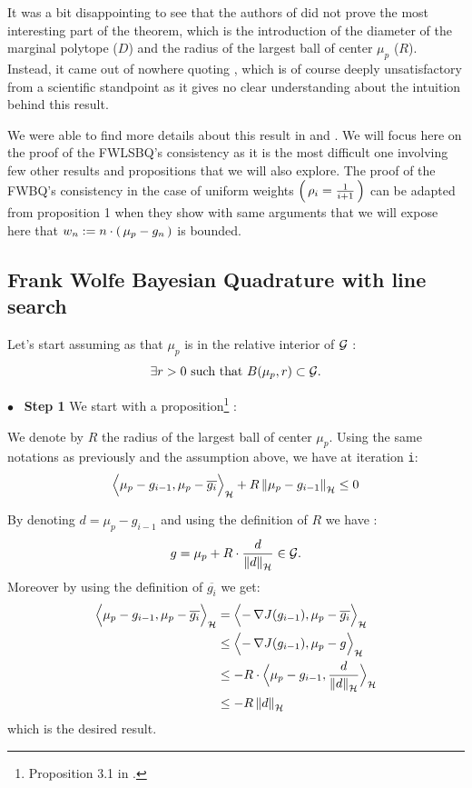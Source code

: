 It was a bit disappointing to see that the authors of \cite{FWBQ} did not prove the most interesting part of the theorem,
 which is the introduction of the diameter of the marginal polytope ($D$) and the radius of the largest ball of center $\mu_p$ ($R$). Instead, it came out of nowhere quoting \cite{Bach}, which is of course deeply unsatisfactory from a scientific standpoint
  as it gives no clear understanding about the intuition behind this result.

  We were able to find more details about this result in \cite{Beck} and \cite{Chen}.
  We will focus here on the proof of the FWLSBQ's consistency as it is the most
  difficult one involving few other results and propositions that we will also
  explore. The proof of the FWBQ's consistency in the case of uniform weights $\left( \, \rho_i=\frac{1}{i+1} \, \right)$ can be adapted from \cite{Chen} proposition 1 when they
  show with same arguments that we will expose here that $w_n := n\cdot
  \left( \, \mu_p-g_n \, \right)$ is bounded.

\subsection*{Frank Wolfe Bayesian Quadrature with line search}

Let's start assuming as \cite{Bach} that $\mu_p$ is in the relative interior
of $\mathcal{G}$ :
\begin{equation}
\exists r>0 \text{ such that } B(\mu_p, r) \subset \mathcal{G}.
\end{equation}

{$\bullet$~\normalfont\bfseries\color{myorange!90!black} Step 1 }We start with a proposition\footnote{Proposition 3.1 in \cite{Beck}.} :
\begin{boxtheorem}
  We denote by $R$ the radius of the largest ball of center $\mu_p$.
  Using the same notations as previously and the assumption above, we have at
  iteration \texttt{i}:
  \begin{equation}
    \label{eq:18}
    \Bigps{\mu_p-g_{i-1}}{\mu_p-\overline{g_{i}}}+R \norme{\mu_p-g_{i-1}} \leq 0
  \end{equation}
\end{boxtheorem}

  By denoting $d = \mu_p-g_{i-1}$ and using the definition of $R$ we have :
\begin{equation*}
  g = \mu_p+R\cdot \frac{d}{\norme{d}} \in \G.
\end{equation*}
Moreover by using the definition of $\overline{g_{i}}$ we get:
  \begin{align*}
\Bigps{\mu_p-g_{i-1}}{\mu_p-\overline{g_{i}}} &=
\Bigps{-\grad{J(g_{i-1})}}{\mu_p-\overline{g_{i}}}\\&\leq
\Bigps{-\grad{J(g_{i-1})}}{\mu_p-g}\\
&\leq -R\cdot\Bigps{\mu_p-g_{i-1}}{\frac{d}{\norme{d}}}\\
&\leq -R \norme{d}
  \end{align*}
  which is the desired result.

